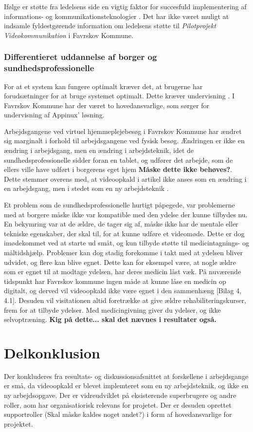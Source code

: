Ifølge  er støtte fra ledelsens side en vigtig faktor for succesfuld implementering af informations- og kommunikationsteknologier \cite{Ikt}. Det har ikke været muligt at indsamle fyldestgørende information om ledelsens støtte til \textit{Pilotprojekt Videokommunikation} i Favrskov Kommune. 

\subsubsection{Differentieret uddannelse af borger og sundhedsprofessionelle}
For at et system kan fungere optimalt kræver det, at brugerne har forudsætninger for at bruge systemet optimalt. Dette kræver undervisning \cite{Ikt}. I Favrskov Kommune har der været to hovedansvarlige, som sørger for undervisning af Appinux' løsning. 

Arbejdsgangene ved virtuel hjemmeplejebesøg i Favrskov Kommune har ændret sig marginalt i forhold til arbejdsgangene ved fysisk besøg. Ændringen er ikke en ændring i arbejdsgang, men en ændring i arbejdsteknik, idet de sundhedsprofessionelle sidder foran en tablet, og udfører det arbejde, som de ellers ville have udført i borgerens eget hjem \textbf{Måske dette ikke behøves?}. Dette stemmer overens med, at videoopkald i artikel  ikke anses som en ændring i en arbejdsgang, men i stedet som en ny arbejdsteknik \cite{telenursing}.  

Et problem som de sundhedsprofessionelle hurtigt påpegede, var problemerne med at borgere måske ikke var kompatible med den ydelse der kunne tilbydes nu. En bekymring var at de ældre, de tager sig af, måske ikke har de mentale eller tekniske egenskaber, der skal til, for at kunne udføre et videomøde. Dette er dog imødekommet ved at starte ud småt, og kun tilbyde støtte til medicintagnings- og måltidshjælp. Problemer kan dog stadig forekomme i takt med at ydelsen bliver udvidet, og flere kan blive egnet. Dette kan for eksempel være, at nogle ældre som er egnet til at modtage ydelsen, har deres medicin låst væk. På nuværende tidspunkt har Favrskov kommune ingen måde at kunne låse en medicin op digitalt, og derved vil videoopkald ikke være egnet i den sammenhæng [Bilag 4, 4.1]. Desuden vil visitationen altid foretrække at give ældre rehabiliteringskurser, frem for at tilbyde ydelser. Med medicingivning giver du ydelser, og ikke selvoptræning. 
\textbf{Kig på dette... skal det nævnes i resultater også.}


\section{Delkonklusion}
Der konkluderes fra resultats- og diskussionsafsnittet at forskellene i arbejdsgange er små, da videoopkald er blevet implemteret som en ny arbejdsteknik, og ikke en ny arbejdsopgave. Der er vidreudviklet på eksisterende superbrugere og andre roller, aom har organisatiorisk relevans for projetet. Der er desuden oprettet supportroller (Skal måske kaldes noget andet?) i form af hovedansvarlige for projektet. 

